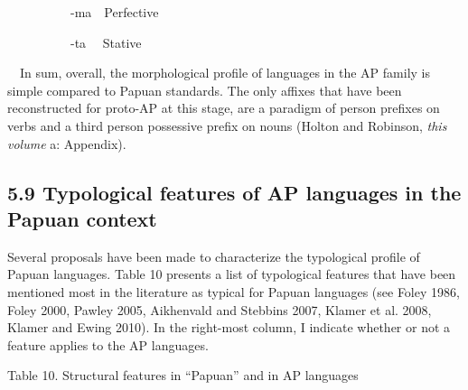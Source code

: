 \ \ \ \ \ \ \ \ \ \ {}-ma\ \ Perfective

\ \ \ \ \ \ \ \ \ \ {}-ta \ \ Stative

\ \ In sum, overall, the morphological profile of languages in the AP family is simple compared to Papuan standards. The only affixes that have been reconstructed for proto-AP at this stage, are a paradigm of person prefixes on verbs and a third person possessive prefix on nouns (Holton and Robinson, \textit{this volume} a: Appendix). 

\subsection[5.9 Typological features of AP languages in the Papuan context ]{5.9 Typological features of AP languages in the Papuan context }
Several proposals have been made to characterize the typological profile of Papuan languages. Table 10 presents a list of typological features that have been mentioned most in the literature as typical for Papuan languages (see Foley 1986, Foley 2000, Pawley 2005, Aikhenvald and Stebbins 2007, Klamer et al. 2008, Klamer and Ewing 2010). In the right-most column, I indicate whether or not a feature applies to the AP languages. 

{\centering
Table 10. Structural features in {\textquotedblleft}Papuan{\textquotedblright} and in AP languages
\par}

